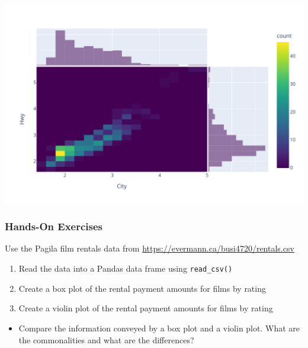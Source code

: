 \begin{center}
  \includegraphics[width=.8\textwidth]{px.heatmap.pdf}
\end{center}


\begin{tcolorbox}[colback=code]
\subsubsection*{Hands-On Exercises}

Use the Pagila film rentals data from \url{https://evermann.ca/busi4720/rentals.csv}
\begin{enumerate}
   \item Read the data into a Pandas data frame using \texttt{read\_csv()}
   \item Create a box plot of the rental payment amounts for films by rating
   \item Create a violin plot of the rental payment amounts for films by rating
\end{enumerate}
\begin{itemize}
\item Compare the information conveyed by a box plot and a violin plot. What are the commonalities and what are the differences?
\end{itemize}
\end{tcolorbox}

